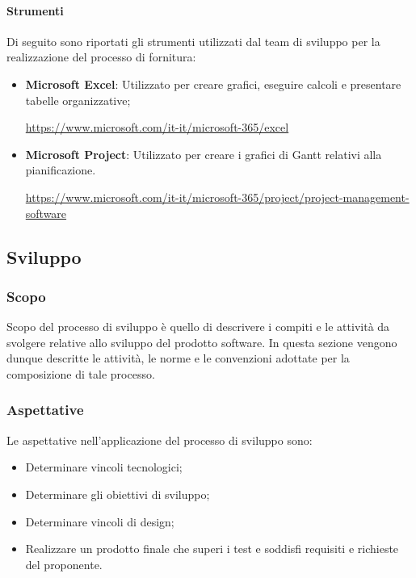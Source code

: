 \paragraph{Strumenti}\label{paragraph: strumenti_fornitura}
Di seguito sono riportati gli strumenti utilizzati dal team di sviluppo per la realizzazione del processo di fornitura:
\begin{itemize}
    \item \textbf{Microsoft Excel}: Utilizzato per creare grafici, eseguire calcoli e presentare tabelle organizzative; 
    \begin{center}
        \url{https://www.microsoft.com/it-it/microsoft-365/excel}
    \end{center}
    \item \textbf{Microsoft Project}: Utilizzato per creare i grafici di Gantt relativi alla pianificazione. 
    \begin{center}
        \url{https://www.microsoft.com/it-it/microsoft-365/project/project-management-software}
    \end{center}
\end{itemize}

\vspace{2cm}

\subsection{Sviluppo} \label{subsection:Sviluppo}
    \subsubsection{Scopo} \label{subsubsection:Sviluppo_Scopo}
    Scopo del processo di sviluppo è quello di descrivere i compiti e le attività da svolgere relative allo sviluppo del prodotto software.
    In questa sezione vengono dunque descritte le attività, le norme e le convenzioni adottate per la composizione di tale processo.

    \subsubsection{Aspettative} \label{subsubsection:Sviluppo_Aspettative}
    Le aspettative nell’applicazione del processo di sviluppo sono:
    \begin{itemize}
        \item Determinare vincoli tecnologici;
        \item Determinare gli obiettivi di sviluppo;
        \item Determinare vincoli di design;
        \item Realizzare un prodotto finale che superi i test e soddisfi requisiti e richieste del proponente.
    \end{itemize}

